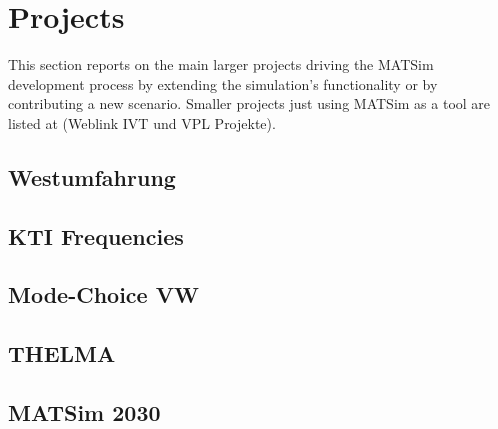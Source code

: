 \chapter{Projects}
\label{ch:projects}

This section reports on the main larger projects driving the MATSim development process by extending the simulation's functionality or by contributing a new scenario. Smaller projects just using MATSim as a tool are listed at (Weblink IVT und VPL Projekte).

\section{Westumfahrung }
\label{sec:wu}

\section{KTI Frequencies }
\label{sec:ktizh}

\section{Mode-Choice VW }

\section{THELMA }
\label{sec:thelma}

\section{MATSim 2030 }
\label{sec:matsim2030}

